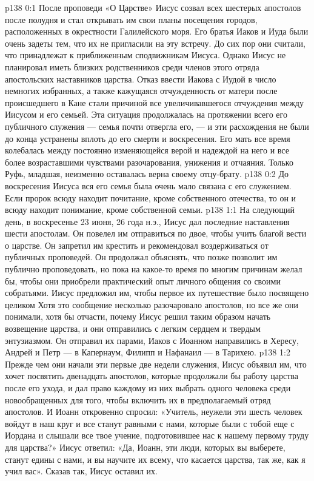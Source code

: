 \author{Комиссия срединников}
\vs p138 0:1 После проповеди «О Царстве» Иисус созвал всех шестерых апостолов после полудня и стал открывать им свои планы посещения городов, расположенных в окрестности Галилейского моря. Его братья Иаков и Иуда были очень задеты тем, что их не пригласили на эту встречу. До сих пор они считали, что принадлежат к приближенным сподвижникам Иисуса. Однако Иисус не планировал иметь близких родственников среди членов этого отряда апостольских наставников царства. Отказ ввести Иакова с Иудой в число немногих избранных, а также кажущаяся отчужденность от матери после происшедшего в Кане стали причиной все увеличивавшегося отчуждения между Иисусом и его семьей. Эта ситуация продолжалась на протяжении всего его публичного служения --- семья почти отвергла его, --- и эти расхождения не были до конца устранены вплоть до его смерти и воскресения. Его мать все время колебалась между постоянно изменяющейся верой и надеждой на него и все более возраставшими чувствами разочарования, унижения и отчаяния. Только Руфь, младшая, неизменно оставалась верна своему отцу\hyp{}брату.
\vs p138 0:2 До воскресения Иисуса вся его семья была очень мало связана с его служением. Если пророк всюду находит почитание, кроме собственного отечества, то он и всюду находит понимание, кроме собственной семьи.
\vs p138 1:1 На следующий день, в воскресенье 23 июня, 26 года н.э., Иисус дал последние наставления шести апостолам. Он повелел им отправиться по двое, чтобы учить благой вести о царстве. Он запретил им крестить и рекомендовал воздерживаться от публичных проповедей. Он продолжал объяснять, что позже позволит им публично проповедовать, но пока на какое\hyp{}то время по многим причинам желал бы, чтобы они приобрели практический опыт личного общения со своими собратьями. Иисус предложил им, чтобы первое их путешествие было посвящено целиком  Хотя это сообщение несколько разочаровало апостолов, но все же они понимали, хотя бы отчасти, почему Иисус решил таким образом начать возвещение царства, и они отправились с легким сердцем и твердым энтузиазмом. Он отправил их парами, Иаков с Иоанном направились в Хересу, Андрей и Петр --- в Капернаум, Филипп и Нафанаил --- в Тарихею.
\vs p138 1:2 Прежде чем они начали эти первые две недели служения, Иисус объявил им, что хочет посвятить двенадцать апостолов, которые продолжали бы работу царства после его ухода, и дал право каждому из них выбрать одного человека среди новообращенных для того, чтобы включить их в предполагаемый отряд апостолов. И Иоанн откровенно спросил: «Учитель, неужели эти шесть человек войдут в наш круг и все станут равными с нами, которые были с тобой еще с Иордана и слышали все твое учение, подготовившее нас к нашему первому труду для царства?» Иисус ответил: «Да, Иоанн, эти люди, которых вы выберете, станут едины с нами, и вы научите их всему, что касается царства, так же, как я учил вас». Сказав так, Иисус оставил их.
